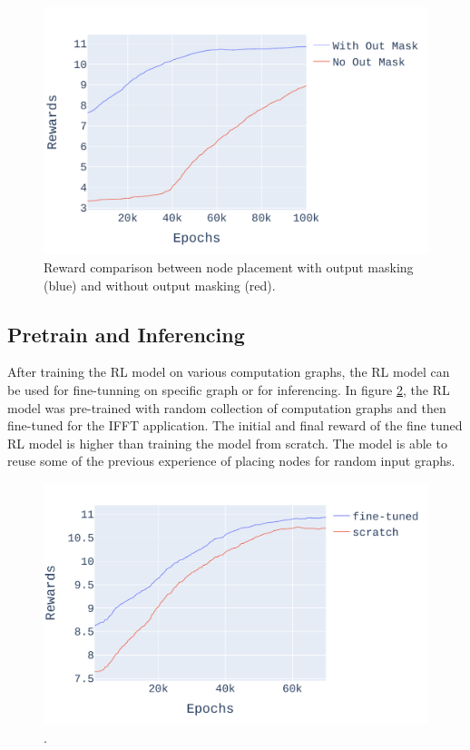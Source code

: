 \begin{figure}[h]
  \centering
  \includegraphics[width=\linewidth]{fig/ifft_masked_nomask.pdf}
  \caption{Reward comparison between node placement with output masking (blue) and without output masking (red).}
  \label{fig:mask_nomask}
\end{figure}

\subsection{Pretrain and Inferencing}

After training the RL model on various computation graphs, the RL model can be used for fine-tunning on specific graph or for inferencing.
In figure \ref{fig:pretrain_ifft}, the RL model was pre-trained with random collection of computation graphs and then fine-tuned for the IFFT application.
The initial and final reward of the fine tuned RL model is higher than training the model from scratch.
The model is able to reuse some of the previous experience of placing nodes for random input graphs.

\begin{figure}[h]
  \centering
  \includegraphics[width=\linewidth]{fig/pretrain_ifft.pdf}
  \caption{.}
  \label{fig:pretrain_ifft}
\end{figure}
